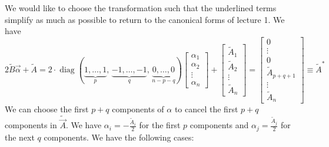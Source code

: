 \documentclass[11pt,a4paper]{article}
\begin{document}
We would like to choose the transformation such that the underlined terms simplify as much as possible to return to the canonical forms of lecture 1.
We have
$$
2\tilde{B}\vec{\alpha} + \tilde{A} =2 \cdot
\operatorname{diag}\!\left(
\underbrace{1,\dots,1}_{p},\,
\underbrace{-1,\dots,-1}_{q},\,
\underbrace{0,\dots,0}_{n-p-q}
\right)
\begin{bmatrix}
	\alpha_1 \\
	\alpha_2 \\
	\vdots \\
	\alpha_n
\end{bmatrix}
+
\begin{bmatrix}
	\tilde{A}_{1} \\
	\tilde{A}_{2} \\
	\vdots \\
\tilde{A}_{n}
\end{bmatrix} = \begin{bmatrix}
0 \\
\vdots \\
0\\
\tilde{A}_{p+q+1}\\
\vdots\\
\tilde{A}_{n}
\end{bmatrix} \equiv \tilde{A}^{*}
$$
We can choose the first $p+q$ components of $\alpha$ to cancel the first $p+q$ components in $\tilde{\vec{A}}$. We have $\alpha_{i} = -\frac{\tilde{A}_{i}}{2}$ for the first $p$ components and $\alpha_{j} = \frac{\tilde{A}_{j}}{2}$ for the next $q$ components. We have the following cases:
\end{document}
